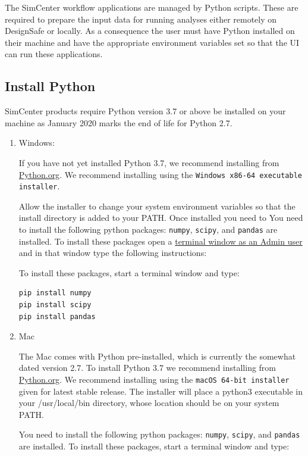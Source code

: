 The SimCenter workflow applications are managed by Python
scripts. These are required to prepare the input data for running
analyses either remotely on DesignSafe or locally. As a consequence the user must have Python
installed on their machine and have the appropriate environment
variables set so that the UI can run these applications.

\subsection{Install Python}

SimCenter products require Python version 3.7 or above be installed on your machine as January 2020 marks the end of life for Python 2.7. 

\begin{enumerate}
\item Windows:

If you have not yet installed Python 3.7, we recommend installing from \href{https://www.python.org/downloads/windows}{Python.org}. We recommend installing using the \texttt{Windows x86-64 executable installer}.

Allow the installer to change your system environment variables so that the install directory is added to your PATH. Once installed you need to You need to install the following python packages: \texttt{numpy}, \texttt{scipy}, and \texttt{pandas} are installed. To install these packages open a \href{https://www.howtogeek.com/194041/how-to-open-the-command-prompt-as-administrator-in-windows-8.1/}{terminal window as an Admin user} and in that window type the following instructions:

To install these packages, start a terminal window and type:

\begin{verbatim}
pip install numpy
pip install scipy
pip install pandas
\end{verbatim}

\item Mac

The Mac comes with Python pre-installed, which is currently the somewhat 
dated version 2.7. To install Python 3.7 we recommend installing from 
\href{https://www.python.org/downloads/}{Python.org}. We recommend installing using the 
\texttt {macOS 64-bit installer} given for latest stable release. The installer will place a python3 executable in your /usr/local/bin directory, whose location should be on your system PATH.

You need to install the following python packages: \texttt{numpy}, \texttt{scipy}, and \texttt{pandas} are installed. 
To install these packages, start a terminal window and type:


\end{enumerate}
